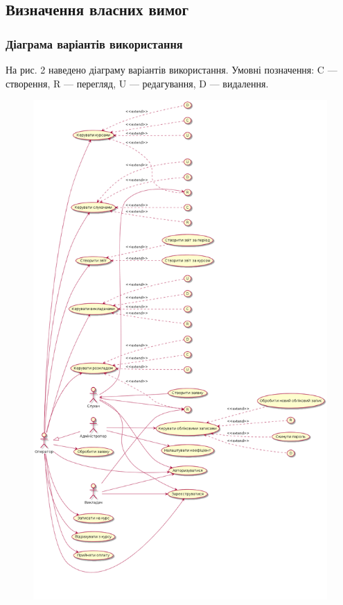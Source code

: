 \subsection{Визначення власних вимог}
\subsubsection{Діаграма варіантів використання}
\bigbreak
На рис. 2 наведено діаграму варіантів використання. Умовні позначення: C --- створення, R --- перегляд, U --- редагування, D --- видалення.

\begin{figure}[t]
\includegraphics[width=14cm]{pp_pw1_uc.png}
\end{figure}
\suppressfloats[t]

